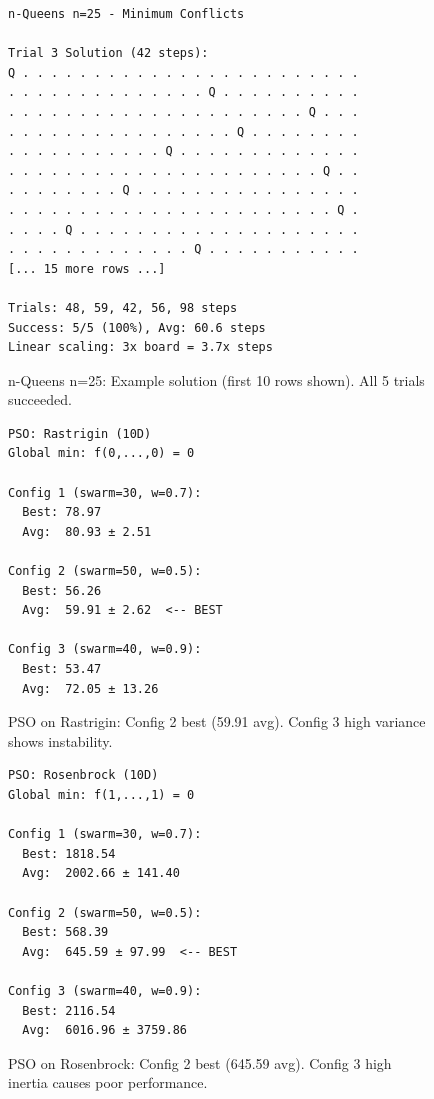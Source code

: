 \documentclass[letterpaper]{article}
\begin{document}
\begin{figure}[h]
\begin{scriptsize}
\begin{verbatim}
n-Queens n=25 - Minimum Conflicts

Trial 3 Solution (42 steps):
Q . . . . . . . . . . . . . . . . . . . . . . . .
. . . . . . . . . . . . . . Q . . . . . . . . . .
. . . . . . . . . . . . . . . . . . . . . Q . . .
. . . . . . . . . . . . . . . . Q . . . . . . . .
. . . . . . . . . . . Q . . . . . . . . . . . . .
. . . . . . . . . . . . . . . . . . . . . . Q . .
. . . . . . . . Q . . . . . . . . . . . . . . . .
. . . . . . . . . . . . . . . . . . . . . . . Q .
. . . . Q . . . . . . . . . . . . . . . . . . . .
. . . . . . . . . . . . . Q . . . . . . . . . . .
[... 15 more rows ...]

Trials: 48, 59, 42, 56, 98 steps
Success: 5/5 (100%), Avg: 60.6 steps
Linear scaling: 3x board = 3.7x steps
\end{verbatim}
\end{scriptsize}
\caption{n-Queens n=25: Example solution (first 10 rows shown). All 5 trials succeeded.}
\label{fig:nqueens-25}
\end{figure}

\begin{figure}[h]
\begin{scriptsize}
\begin{verbatim}
PSO: Rastrigin (10D)
Global min: f(0,...,0) = 0

Config 1 (swarm=30, w=0.7):
  Best: 78.97
  Avg:  80.93 ± 2.51

Config 2 (swarm=50, w=0.5):
  Best: 56.26
  Avg:  59.91 ± 2.62  <-- BEST

Config 3 (swarm=40, w=0.9):
  Best: 53.47
  Avg:  72.05 ± 13.26
\end{verbatim}
\end{scriptsize}
\caption{PSO on Rastrigin: Config 2 best (59.91 avg). Config 3 high variance shows instability.}
\label{fig:pso-rastrigin}
\end{figure}

\begin{figure}[h]
\begin{scriptsize}
\begin{verbatim}
PSO: Rosenbrock (10D)
Global min: f(1,...,1) = 0

Config 1 (swarm=30, w=0.7):
  Best: 1818.54
  Avg:  2002.66 ± 141.40

Config 2 (swarm=50, w=0.5):
  Best: 568.39
  Avg:  645.59 ± 97.99  <-- BEST

Config 3 (swarm=40, w=0.9):
  Best: 2116.54
  Avg:  6016.96 ± 3759.86
\end{verbatim}
\end{scriptsize}
\caption{PSO on Rosenbrock: Config 2 best (645.59 avg). Config 3 high inertia causes poor performance.}
\label{fig:pso-rosenbrock}
\end{figure}
\end{document}
